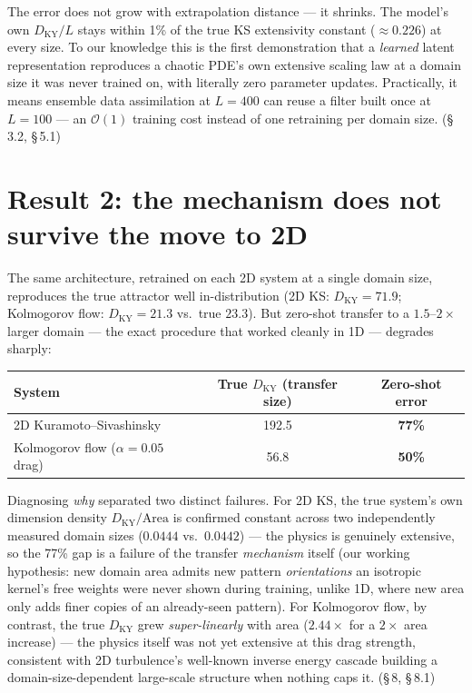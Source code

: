 \documentclass[11pt]{article}
\newcommand{\DKY}{D_{\mathrm{KY}}}
\begin{document}
The error does not grow with extrapolation distance --- it shrinks. The
model's own $\DKY/L$ stays within 1\% of the true KS extensivity
constant ($\approx0.226$) at every size. To our knowledge this is the
first demonstration that a \emph{learned} latent representation
reproduces a chaotic PDE's own extensive scaling law at a domain size it
was never trained on, with literally zero parameter updates. Practically,
it means ensemble data assimilation at $L{=}400$ can reuse a filter built
once at $L{=}100$ --- an $\mathcal O(1)$ training cost instead of one
retraining per domain size. (\S\,3.2, \S\,5.1)

\section{Result 2: the mechanism does not survive the move to 2D}

The same architecture, retrained on each 2D system at a single domain
size, reproduces the true attractor well in-distribution (2D KS:
$\DKY{=}71.9$; Kolmogorov flow: $\DKY{=}21.3$ vs.\ true $23.3$). But
zero-shot transfer to a $1.5$--$2\times$ larger domain --- the exact
procedure that worked cleanly in 1D --- degrades sharply:

\begin{center}
\begin{tabular}{lcc}
\toprule
System & True $\DKY$ (transfer size) & Zero-shot error \\
\midrule
2D Kuramoto--Sivashinsky & 192.5 & \textbf{77\%} \\
Kolmogorov flow ($\alpha=0.05$ drag) & 56.8 & \textbf{50\%} \\
\bottomrule
\end{tabular}
\end{center}

Diagnosing \emph{why} separated two distinct failures. For 2D KS, the
true system's own dimension density $\DKY/\mathrm{Area}$ is confirmed
constant across two independently measured domain sizes ($0.0444$ vs.\
$0.0442$) --- the physics is genuinely extensive, so the 77\% gap is a
failure of the transfer \emph{mechanism} itself (our working hypothesis:
new domain area admits new pattern \emph{orientations} an isotropic
kernel's free weights were never shown during training, unlike 1D, where
new area only adds finer copies of an already-seen pattern). For
Kolmogorov flow, by contrast, the true $\DKY$ grew \emph{super-linearly}
with area ($2.44\times$ for a $2\times$ area increase) --- the physics
itself was not yet extensive at this drag strength, consistent with 2D
turbulence's well-known inverse energy cascade building a
domain-size-dependent large-scale structure when nothing caps it.
(\S\,8, \S\,8.1)
\end{document}
